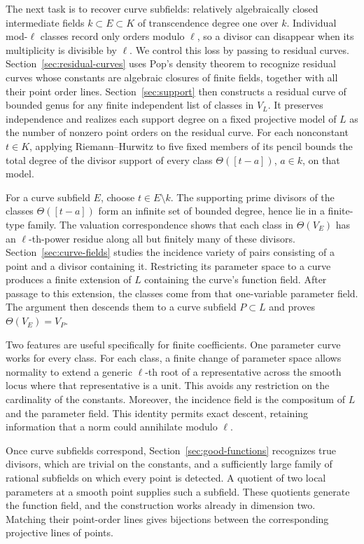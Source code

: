 The next task is to recover curve subfields: relatively algebraically
closed intermediate fields $k\subset E\subset K$ of transcendence
degree one over $k$. Individual
mod-$\ell$ classes record only orders modulo $\ell$, so a divisor can
disappear when its multiplicity is divisible by $\ell$. We control
this loss by passing to residual curves. Section~\ref{sec:residual-curves}
uses Pop's density theorem to recognize residual curves whose constants
are algebraic closures of finite fields, together with all their point
order lines. Section~\ref{sec:support} then constructs a residual
curve of bounded genus for any finite independent list of classes
in $V_L$. It preserves independence and realizes each support degree
on a fixed projective model of $L$ as the number of nonzero point
orders on the residual curve.
For each nonconstant $t\in K$, applying Riemann--Hurwitz to five fixed
members of its pencil bounds the total degree of the divisor support
of every class $\Theta([t-a])$, $a\in k$,
on that model.

For a curve subfield $E$, choose $t\in E\setminus k$. The supporting
prime divisors of the classes $\Theta([t-a])$ form an infinite set of
bounded degree, hence lie in a finite-type family. The valuation
correspondence shows that each class in
$\Theta(V_E)$ has an $\ell$-th-power residue along all but finitely many
of these divisors. Section~\ref{sec:curve-fields} studies the incidence
variety of pairs consisting of a point and a divisor containing it.
Restricting its parameter space to a curve produces a finite extension
of $L$ containing the curve's function field. After passage to this
extension, the classes come from that one-variable parameter field.
The argument then descends them to a curve subfield $P\subset L$
and proves $\Theta(V_E)=V_P$.

Two features are useful specifically for finite coefficients. One
parameter curve works for every class. For each class, a finite change
of parameter space allows normality to extend a generic $\ell$-th root
of a representative across the smooth locus where that representative
is a unit. This
avoids any restriction on the cardinality of the constants. Moreover,
the incidence field is the compositum of $L$ and the parameter field.
This identity permits exact descent, retaining information that a
norm could annihilate modulo $\ell$.

Once curve subfields correspond, Section~\ref{sec:good-functions}
recognizes true divisors, which are trivial on the constants, and a
sufficiently large family of rational
subfields on which every point is detected. A quotient of two local
parameters at a smooth point supplies such a subfield. These quotients
generate the function field, and the construction works already in
dimension two. Matching their point-order lines gives bijections
between the corresponding projective lines of points.

